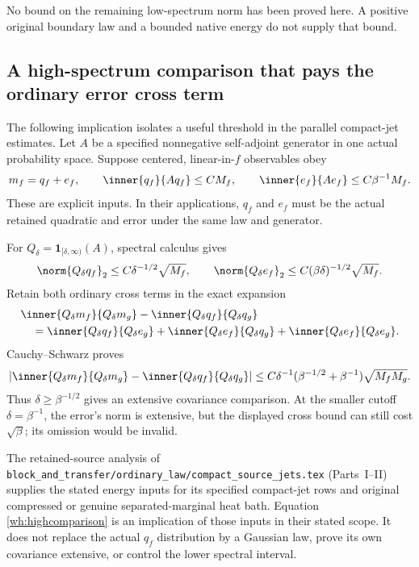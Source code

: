 No bound on the remaining low-spectrum norm has been proved here. A positive original boundary law and a bounded native energy do not supply that bound.

\subsection{A high-spectrum comparison that pays the ordinary error cross term}

The following implication isolates a useful threshold in the parallel compact-jet estimates. Let \(A\) be a specified nonnegative self-adjoint generator in one actual probability space. Suppose centered, linear-in-\(f\) observables obey
\[
 m_f=q_f+e_f,\qquad
 \inner{q_f}{Aq_f}\le C M_f,\qquad
 \inner{e_f}{Ae_f}\le C\beta^{-1}M_f.
\]
These are explicit inputs. In their applications, \(q_f\) and \(e_f\) must be the actual retained quadratic and error under the same law and generator.

For \(Q_\delta=\mathbf1_{[\delta,\infty)}(A)\), spectral calculus gives
\[
 \norm{Q_\delta q_f}_2\le C\delta^{-1/2}\sqrt{M_f},
 \qquad
 \norm{Q_\delta e_f}_2\le C(\beta\delta)^{-1/2}\sqrt{M_f}.
\]
Retain both ordinary cross terms in the exact expansion
\begin{align*}
 &\inner{Q_\delta m_f}{Q_\delta m_g}
          -\inner{Q_\delta q_f}{Q_\delta q_g}\\
 &\quad=
 \inner{Q_\delta q_f}{Q_\delta e_g}
 +\inner{Q_\delta e_f}{Q_\delta q_g}
 +\inner{Q_\delta e_f}{Q_\delta e_g}.
\end{align*}
Cauchy--Schwarz proves
\begin{equation}
 \left|
 \inner{Q_\delta m_f}{Q_\delta m_g}
       -\inner{Q_\delta q_f}{Q_\delta q_g}
 \right|
 \le
 C\delta^{-1}(\beta^{-1/2}+\beta^{-1})
       \sqrt{M_fM_g}.
 \label{wh:highcomparison}
\end{equation}
Thus \(\delta\ge\beta^{-1/2}\) gives an extensive covariance comparison. At the smaller cutoff \(\delta=\beta^{-1}\), the error's norm is extensive, but the displayed cross bound can still cost \(\sqrt\beta\); its omission would be invalid.

The retained-source analysis of \texttt{block\_and\_transfer/ordinary\_law/compact\_source\_jets.tex} (Parts~I--II) supplies the stated energy inputs for its specified compact-jet rows and original compressed or genuine separated-marginal heat bath. Equation \eqref{wh:highcomparison} is an implication of those inputs in their stated scope. It does not replace the actual \(q_f\) distribution by a Gaussian law, prove its own covariance extensive, or control the lower spectral interval.

